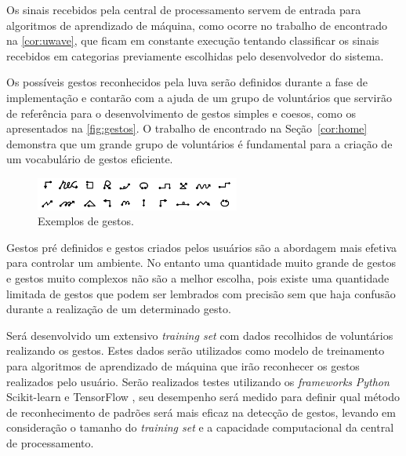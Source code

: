 Os sinais recebidos pela central de processamento servem de entrada para algoritmos de aprendizado de máquina, como ocorre no trabalho de  encontrado na \autoref{cor:uwave}, que ficam em constante execução tentando classificar os sinais recebidos em categorias previamente escolhidas pelo desenvolvedor do sistema. 


Os possíveis gestos reconhecidos pela luva serão definidos durante a fase de implementação e contarão com a ajuda de um grupo de voluntários que servirão de referência para o desenvolvimento de gestos simples e coesos, como os apresentados na \autoref{fig:gestos}. O trabalho de  encontrado na Seção~\ref{cor:home} demonstra que um grande grupo de voluntários é fundamental para a criação de um vocabulário de gestos eficiente.

\begin{figure}[ht]
    \centering
    \includegraphics[width=0.6\textwidth, keepaspectratio]{resources/gestos.png}
    \caption{Exemplos de gestos. \cite{accelerometer:2006}}
    \label{fig:gestos}
\end{figure}


Gestos pré definidos e gestos criados pelos usuários são a abordagem mais efetiva para controlar um ambiente.
No entanto uma quantidade muito grande de gestos e gestos muito complexos não são a melhor escolha, pois existe uma quantidade limitada de gestos que podem ser lembrados com precisão sem que haja confusão durante a realização de um determinado gesto.

Será desenvolvido um extensivo \textit{training set} com dados recolhidos de voluntários realizando os gestos. Estes dados serão utilizados como modelo de treinamento para algoritmos de aprendizado de máquina que irão reconhecer os gestos realizados pelo usuário. Serão realizados testes utilizando os \textit{frameworks} \textit{Python} Scikit-learn \cite{scikit-learn} e TensorFlow \cite{tensorflow:2016}, seu desempenho será medido para definir qual método de reconhecimento de padrões será mais eficaz na detecção de gestos, levando em consideração o tamanho do \textit{training set} e a capacidade computacional da central de processamento. 


